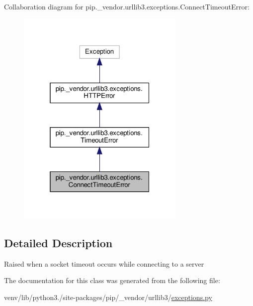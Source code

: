 Collaboration diagram for pip.\+\_\+vendor.\+urllib3.\+exceptions.\+Connect\+Timeout\+Error\+:
\nopagebreak
\begin{figure}[H]
\begin{center}
\leavevmode
\includegraphics[width=229pt]{classpip_1_1__vendor_1_1urllib3_1_1exceptions_1_1ConnectTimeoutError__coll__graph}
\end{center}
\end{figure}


\subsection{Detailed Description}
\begin{DoxyVerb}Raised when a socket timeout occurs while connecting to a server\end{DoxyVerb}
 

The documentation for this class was generated from the following file\+:\begin{DoxyCompactItemize}
\item 
venv/lib/python3./site-\/packages/pip/\+\_\+vendor/urllib3/\hyperlink{pip_2__vendor_2urllib3_2exceptions_8py}{exceptions.\+py}\end{DoxyCompactItemize}
